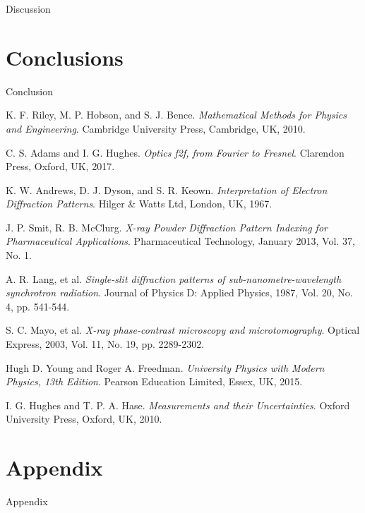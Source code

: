 \documentclass[twocolumn]{revtex4}
\begin{document}
Discussion

\vspace{-5ex}
\section{Conclusions}
\vspace{-2ex}

Conclusion

\begin{thebibliography}{5}
	K. F. Riley, M. P. Hobson, and S. J. Bence.
	\textit{Mathematical Methods for Physics and Engineering}.
	Cambridge University Press, Cambridge, UK, 2010.
	
	C. S. Adams and I. G. Hughes.
	\textit{Optics f2f, from Fourier to Fresnel}.
	Clarendon Press, Oxford, UK, 2017.

	K. W. Andrews, D. J. Dyson, and S. R. Keown.
	\textit{Interpretation of Electron Diffraction Patterns}.
	Hilger \& Watts Ltd, London, UK, 1967.
	
	J. P. Smit, R. B. McClurg.	
	\textit{X-ray Powder Diffraction Pattern Indexing for Pharmaceutical Applications}.
	Pharmaceutical Technology, January 2013, Vol. 37, No. 1.
	
	A. R. Lang, et al.
	\textit{Single-slit diffraction patterns of sub-nanometre-wavelength synchrotron radiation}.
	Journal of Physics D: Applied Physics, 1987, Vol. 20, No. 4, pp. 541-544.
	
	S. C. Mayo, et al.
	\textit{X-ray phase-contrast microscopy and microtomography}.
	Optical Express, 2003, Vol. 11, No. 19, pp. 2289-2302.

	Hugh D. Young and Roger A. Freedman.
	\textit{University Physics with Modern Physics, 13th Edition}. 
	Pearson Education Limited, Essex, UK, 2015.
	
	
	I. G. Hughes and T. P. A. Hase.
	\textit{Measurements and their Uncertainties}. 
	Oxford University Press, Oxford, UK, 2010.
	
\end{thebibliography}
\clearpage

\vfill
\twocolumngrid
\vspace{-3ex}
\section*{Appendix}
\vspace{-2ex}

Appendix


\clearpage
\end{document}
